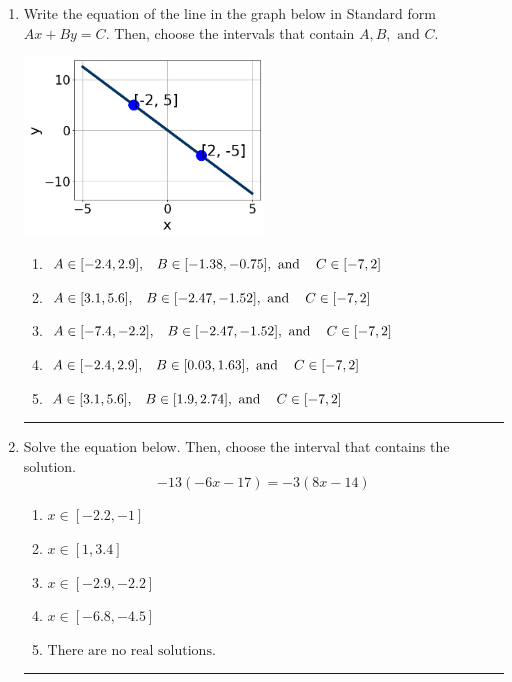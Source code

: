 \documentclass[14pt]{extbook}
\newcommand{\litem}[1]{\item#1\hspace*{-1cm}\rule{\textwidth}{0.4pt}}
\begin{document}
\begin{enumerate}
{\begin{enumerate}[label=\Alph*.]
\end{enumerate} }
\litem{
Write the equation of the line in the graph below in Standard form $Ax+By=C$. Then, choose the intervals that contain $A, B, \text{ and } C$.
\begin{center}
    \includegraphics[width=0.5\textwidth]{../Figures/linearGraphToStandardB.png}
\end{center}
\begin{enumerate}[label=\Alph*.]
\item \( A \in [-2.4, 2.9], \hspace{3mm} B \in [-1.38, -0.75], \text{ and } \hspace{3mm} C \in [-7, 2] \)
\item \( A \in [3.1, 5.6], \hspace{3mm} B \in [-2.47, -1.52], \text{ and } \hspace{3mm} C \in [-7, 2] \)
\item \( A \in [-7.4, -2.2], \hspace{3mm} B \in [-2.47, -1.52], \text{ and } \hspace{3mm} C \in [-7, 2] \)
\item \( A \in [-2.4, 2.9], \hspace{3mm} B \in [0.03, 1.63], \text{ and } \hspace{3mm} C \in [-7, 2] \)
\item \( A \in [3.1, 5.6], \hspace{3mm} B \in [1.9, 2.74], \text{ and } \hspace{3mm} C \in [-7, 2] \)

\end{enumerate} }
\litem{
Solve the equation below. Then, choose the interval that contains the solution.\[ -13(-6x -17) = -3(8x -14) \]\begin{enumerate}[label=\Alph*.]
\item \( x \in [-2.2, -1] \)
\item \( x \in [1, 3.4] \)
\item \( x \in [-2.9, -2.2] \)
\item \( x \in [-6.8, -4.5] \)
\item \( \text{There are no real solutions.} \)


\end{enumerate}}
\end{enumerate}
\end{document}
